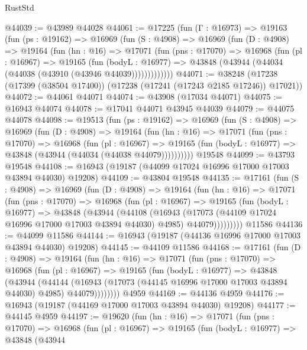 \begin{lexlean}{RustStd}
\begin{coremodule}
@44039 := @43989 @44028
@44061 := @17225
    (fun (Γ : @16973) =>
    @19163
      (fun (ps : @19162) =>
      @16969
        (fun (S : @4908) =>
        @16969
          (fun (D : @4908) =>
          @19164
            (fun (hn : @16) =>
            @17071
              (fun (pns : @17070) =>
              @16968
                (fun (pl : @16967) =>
                @19165
                  (fun (bodyL : @16977) =>
                  @43848 (@43944 (@44034 (@44038 (@43910 (@43946 @44039)))))))))))))
@44071 := @38248 (@17238 (@17399 (@38504 @17400)) (@17238 (@17241 (@17243 @2185 @17246)) @17021))
@44072 := @44061 @44071
@44074 := @43908 (@17034 @44071)
@44075 := @16943 @44074
@44078 := @17041 @44071 @43945 @44039
@44079 := @44075 @44078
@44098 := @19513
    (fun (ps : @19162) =>
    @16969
      (fun (S : @4908) =>
      @16969
        (fun (D : @4908) =>
        @19164
          (fun (hn : @16) =>
          @17071
            (fun (pns : @17070) =>
            @16968
              (fun (pl : @16967) =>
              @19165 (fun (bodyL : @16977) => @43848 (@43944 (@44034 (@44038 @44079))))))))))
    @19548
@44099 := @43793 @19548
@44108 := @16943 (@19187 (@44099 @17024 @16996 @17000 @17003 @43894 @44030) @19208)
@44109 := @43804 @19548
@44135 := @17161
    (fun (S : @4908) =>
    @16969
      (fun (D : @4908) =>
      @19164
        (fun (hn : @16) =>
        @17071
          (fun (pns : @17070) =>
          @16968
            (fun (pl : @16967) =>
            @19165
              (fun (bodyL : @16977) =>
              @43848
                (@43944
                  (@44108
                    (@16943
                      (@17073 (@44109 @17024 @16996 @17000 @17003 @43894 @44030) @4985)
                      @44079)))))))))
    @11586
@44136 := @44099 @11586
@44144 := @16943 (@19187 (@44136 @16996 @17000 @17003 @43894 @44030) @19208)
@44145 := @44109 @11586
@44168 := @17161
    (fun (D : @4908) =>
    @19164
      (fun (hn : @16) =>
      @17071
        (fun (pns : @17070) =>
        @16968
          (fun (pl : @16967) =>
          @19165
            (fun (bodyL : @16977) =>
            @43848
              (@43944
                (@44144
                  (@16943 (@17073 (@44145 @16996 @17000 @17003 @43894 @44030) @4985) @44079))))))))
    @4959
@44169 := @44136 @4959
@44176 := @16943 (@19187 (@44169 @17000 @17003 @43894 @44030) @19208)
@44177 := @44145 @4959
@44197 := @19620
    (fun (hn : @16) =>
    @17071
      (fun (pns : @17070) =>
      @16968
        (fun (pl : @16967) =>
        @19165
          (fun (bodyL : @16977) =>
          @43848
            (@43944

\end{coremodule}
\end{lexlean}
